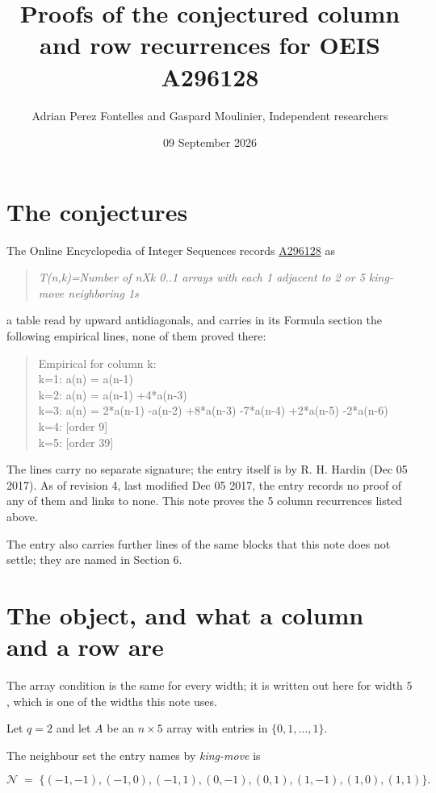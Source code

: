 \documentclass[11pt]{article}
\title{Proofs of the conjectured column and row recurrences for OEIS A296128}
\author{Adrian Perez Fontelles and Gaspard Moulinier, Independent researchers}
\date{09 September 2026}
\theoremstyle{definition}
\begin{document}
\maketitle
\section{The conjectures}

The Online Encyclopedia of Integer Sequences records \href{https://oeis.org/A296128}{A296128} as

\begin{quote}\itshape T(n,k)=Number of nXk 0..1 arrays with each 1 adjacent to 2 or 5 king-move neighboring 1s\end{quote}

a table read by upward antidiagonals, and carries in its Formula section the following empirical lines, none of them proved there:

\begin{quote}\ttfamily Empirical for column k:\\
k=1: a(n) = a(n-1)\\k=2: a(n) = a(n-1) +4*a(n-3)\\k=3: a(n) = 2*a(n-1) -a(n-2) +8*a(n-3) -7*a(n-4) +2*a(n-5) -2*a(n-6)\\k=4: [order 9]\\k=5: [order 39]\end{quote}

The lines carry no separate signature; the entry itself is by R. H. Hardin (Dec 05 2017). As of revision 4, last modified Dec 05 2017, the entry records no proof of any of them and links to none. This note proves the 5 column recurrences listed above.

The entry also carries further lines of the same blocks that this note does not settle; they are named in Section 6.

\section{The object, and what a column and a row are}

The array condition is the same for every width; it is written out here for width $5$, which is one of the widths this note uses.

Let $q = 2$ and let $A$ be an $n \times 5$ array with entries in $\{0,1,\dots,1\}$.

The neighbour set the entry names by {\itshape king-move} is

\[\mathcal{N} \;=\; \{(-1,-1), (-1,0), (-1,1), (0,-1), (0,1), (1,-1), (1,0), (1,1)\}.\]
\end{document}
